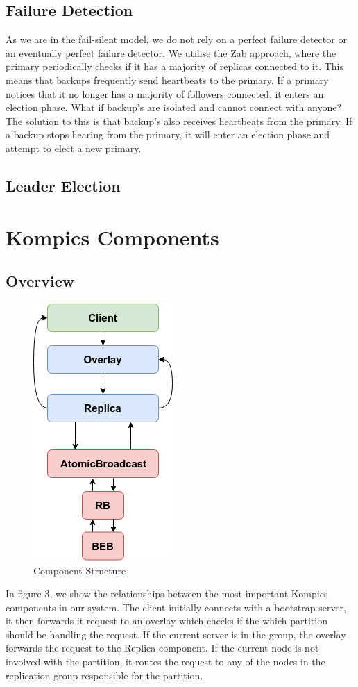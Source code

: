 \documentclass[12pt]{article}
\begin{document}
\subsection{Failure Detection}
As we are in the fail-silent model, we do not rely on a perfect failure detector or an eventually perfect failure detector. We utilise the Zab approach, where the primary periodically checks if it has a majority of replicas connected to it. This means that backups frequently send heartbeats to the primary. If a primary notices that it no longer has a majority of followers connected, it enters an election phase. What if backup’s are isolated and cannot connect with anyone? The solution to this is that backup’s also receives heartbeats from the primary. If a backup stops hearing from the primary, it will enter an election phase and attempt to elect a new primary.

\subsection{Leader Election}

\section{Kompics Components}
\subsection{Overview}
\begin{figure}[H]
  \centering
  \includegraphics[scale=0.90]{img/components.png}
  \caption[Caption for LOF]{Component Structure}  
  \label{fig:picture}
\end{figure}
In figure 3, we show the relationships between the most important Kompics components in our system. The client initially connects with a bootstrap server, it then forwards it request to an overlay which checks if the which partition should be handling the request. If the current server is in the group, the overlay forwards the request to the Replica component. If the current node is not involved with the partition, it routes the request to any of the nodes in the replication group responsible for the partition.
\end{document}
